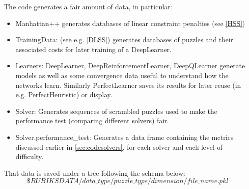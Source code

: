 
The code generates a fair amount of data, in particular:
\begin{itemize}
\item Manhattan++ generates databases of linear constraint penalties (see \ref{HSS})
\item TrainingData: (see e.g. \ref{DLSS}) generates databases of puzzles and their associated costs for later training of a DeepLearner.
\item Learners: DeepLearner, DeepReinforcementLearner, DeepQLearner generate models as well as some convergence data useful to understand how the networks learn. Similarly PerfectLearner saves its results for later reuse (in e.g. PerfectHeuristic) or display.
\item Solver: Generates sequences of scrambled puzzles used to make the performance test (comparing different solvers) fair.
\item Solver.performance\_test: Generates a data frame containing the metrics discussed earlier in \ref{sec:codesolvers}, for each solver and each level of difficulty.
\end{itemize}
That data is saved under a tree following the schema below:
$$\$RUBIKSDATA/data\_type/puzzle\_type/dimension/file\_name.pkl$$

